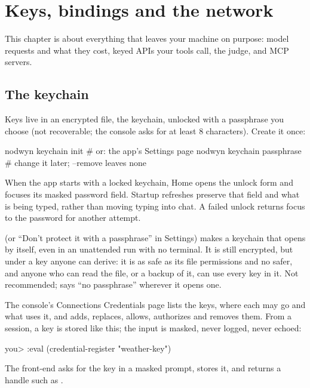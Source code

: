 \chapter{Keys, bindings and the network}
\label{ch:keys}

This chapter is about everything that leaves your machine on purpose: model
requests and what they cost, keyed APIs your tools call, the judge, and MCP
servers.

\section{The keychain}

Keys live in an encrypted file, the keychain, unlocked with a passphrase
you choose (not recoverable; the console asks for at least 8 characters). Create it once:

\begin{sh}
nodwyn keychain init          # or: the app's Settings page
nodwyn keychain passphrase    # change it later; --remove leaves none
\end{sh}

When the app starts with a locked keychain, Home opens the unlock form and
focuses its masked password field. Startup refreshes preserve that field and
what is being typed, rather than moving typing into chat. A failed unlock
returns focus to the password for another attempt.

 (or ``Don't protect it with a
passphrase'' in Settings) makes a keychain that opens by itself, even in an
unattended run with no terminal. It is still encrypted, but under a key
anyone can derive: it is as safe as its file permissions and no safer, and
anyone who can read the file, or a backup of it, can use every key in it.
Not recommended; \nodwyn{} says ``no passphrase'' wherever it opens one.

The console's Connections \textrightarrow{} Credentials page lists the keys,
where each may go and what uses it, and adds, replaces, allows, authorizes
and removes them. From a session, a key is stored like this; the input is
masked, never logged, never echoed:

\begin{txt}
you> :eval (credential-register "weather-key")
\end{txt}

The front-end asks for the key in a masked prompt, stores it, and returns a
handle such as .

